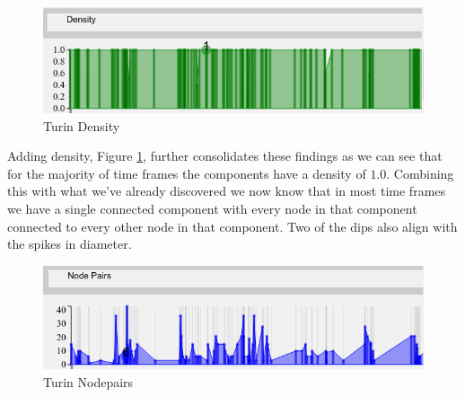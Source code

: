 \begin{figure}[h!]
  \begin{center}
  \includegraphics[trim={0 0 0 0}, width=140mm]{./Figures/TurinDensity.png}
  \caption{Turin Density}
  \label{fig:TurinDensity}
  \end{center}
\end{figure}
Adding density, Figure \ref{fig:TurinDensity}, further consolidates these findings as we can see that for the majority of time frames the components have a density of $1.0$. Combining this with what we've already discovered we now know that in most time frames we have a single connected component with every node in that component connected to every other node in that component. Two of the dips also align with the spikes in diameter.

\begin{figure}[h!]
  \begin{center}
  \includegraphics[trim={0 0 0 0}, width=140mm]{./Figures/TurinNodePairs.png}
  \caption{Turin Nodepairs}
  \label{fig:TurinNodePairs}
  \end{center}
\end{figure}

